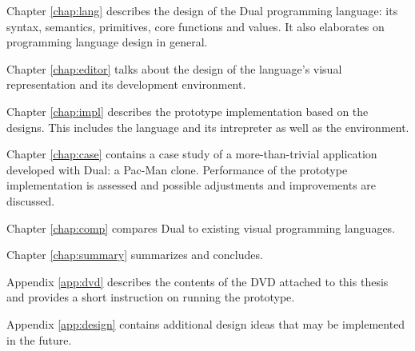 Chapter \ref{chap:lang} describes the design of the Dual programming language: its syntax, semantics, primitives, core functions and values. It also elaborates on programming language design in general.

Chapter \ref{chap:editor} talks about the design of the language's visual representation and its development environment. 

Chapter \ref{chap:impl} describes the prototype implementation based on the designs. This includes the language and its intrepreter as well as the environment.

Chapter \ref{chap:case} contains a case study of a more-than-trivial application developed with Dual: a Pac-Man clone. Performance of the prototype implementation is assessed and possible adjustments and improvements are discussed.

Chapter \ref{chap:comp} compares Dual to existing visual programming languages.

Chapter \ref{chap:summary} summarizes and concludes.

Appendix \ref{app:dvd} describes the contents of the DVD attached to this thesis and provides a short instruction on running the prototype.

Appendix \ref{app:design} contains additional design ideas that may be implemented in the future.
